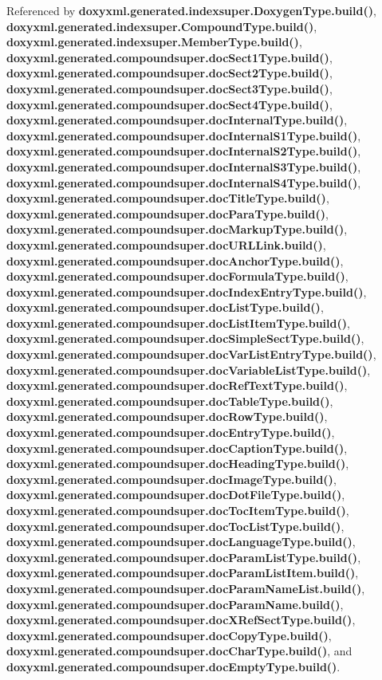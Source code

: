 Referenced by {\bf doxyxml.\+generated.\+indexsuper.\+Doxygen\+Type.\+build()}, {\bf doxyxml.\+generated.\+indexsuper.\+Compound\+Type.\+build()}, {\bf doxyxml.\+generated.\+indexsuper.\+Member\+Type.\+build()}, {\bf doxyxml.\+generated.\+compoundsuper.\+doc\+Sect1\+Type.\+build()}, {\bf doxyxml.\+generated.\+compoundsuper.\+doc\+Sect2\+Type.\+build()}, {\bf doxyxml.\+generated.\+compoundsuper.\+doc\+Sect3\+Type.\+build()}, {\bf doxyxml.\+generated.\+compoundsuper.\+doc\+Sect4\+Type.\+build()}, {\bf doxyxml.\+generated.\+compoundsuper.\+doc\+Internal\+Type.\+build()}, {\bf doxyxml.\+generated.\+compoundsuper.\+doc\+Internal\+S1\+Type.\+build()}, {\bf doxyxml.\+generated.\+compoundsuper.\+doc\+Internal\+S2\+Type.\+build()}, {\bf doxyxml.\+generated.\+compoundsuper.\+doc\+Internal\+S3\+Type.\+build()}, {\bf doxyxml.\+generated.\+compoundsuper.\+doc\+Internal\+S4\+Type.\+build()}, {\bf doxyxml.\+generated.\+compoundsuper.\+doc\+Title\+Type.\+build()}, {\bf doxyxml.\+generated.\+compoundsuper.\+doc\+Para\+Type.\+build()}, {\bf doxyxml.\+generated.\+compoundsuper.\+doc\+Markup\+Type.\+build()}, {\bf doxyxml.\+generated.\+compoundsuper.\+doc\+U\+R\+L\+Link.\+build()}, {\bf doxyxml.\+generated.\+compoundsuper.\+doc\+Anchor\+Type.\+build()}, {\bf doxyxml.\+generated.\+compoundsuper.\+doc\+Formula\+Type.\+build()}, {\bf doxyxml.\+generated.\+compoundsuper.\+doc\+Index\+Entry\+Type.\+build()}, {\bf doxyxml.\+generated.\+compoundsuper.\+doc\+List\+Type.\+build()}, {\bf doxyxml.\+generated.\+compoundsuper.\+doc\+List\+Item\+Type.\+build()}, {\bf doxyxml.\+generated.\+compoundsuper.\+doc\+Simple\+Sect\+Type.\+build()}, {\bf doxyxml.\+generated.\+compoundsuper.\+doc\+Var\+List\+Entry\+Type.\+build()}, {\bf doxyxml.\+generated.\+compoundsuper.\+doc\+Variable\+List\+Type.\+build()}, {\bf doxyxml.\+generated.\+compoundsuper.\+doc\+Ref\+Text\+Type.\+build()}, {\bf doxyxml.\+generated.\+compoundsuper.\+doc\+Table\+Type.\+build()}, {\bf doxyxml.\+generated.\+compoundsuper.\+doc\+Row\+Type.\+build()}, {\bf doxyxml.\+generated.\+compoundsuper.\+doc\+Entry\+Type.\+build()}, {\bf doxyxml.\+generated.\+compoundsuper.\+doc\+Caption\+Type.\+build()}, {\bf doxyxml.\+generated.\+compoundsuper.\+doc\+Heading\+Type.\+build()}, {\bf doxyxml.\+generated.\+compoundsuper.\+doc\+Image\+Type.\+build()}, {\bf doxyxml.\+generated.\+compoundsuper.\+doc\+Dot\+File\+Type.\+build()}, {\bf doxyxml.\+generated.\+compoundsuper.\+doc\+Toc\+Item\+Type.\+build()}, {\bf doxyxml.\+generated.\+compoundsuper.\+doc\+Toc\+List\+Type.\+build()}, {\bf doxyxml.\+generated.\+compoundsuper.\+doc\+Language\+Type.\+build()}, {\bf doxyxml.\+generated.\+compoundsuper.\+doc\+Param\+List\+Type.\+build()}, {\bf doxyxml.\+generated.\+compoundsuper.\+doc\+Param\+List\+Item.\+build()}, {\bf doxyxml.\+generated.\+compoundsuper.\+doc\+Param\+Name\+List.\+build()}, {\bf doxyxml.\+generated.\+compoundsuper.\+doc\+Param\+Name.\+build()}, {\bf doxyxml.\+generated.\+compoundsuper.\+doc\+X\+Ref\+Sect\+Type.\+build()}, {\bf doxyxml.\+generated.\+compoundsuper.\+doc\+Copy\+Type.\+build()}, {\bf doxyxml.\+generated.\+compoundsuper.\+doc\+Char\+Type.\+build()}, and {\bf doxyxml.\+generated.\+compoundsuper.\+doc\+Empty\+Type.\+build()}.



